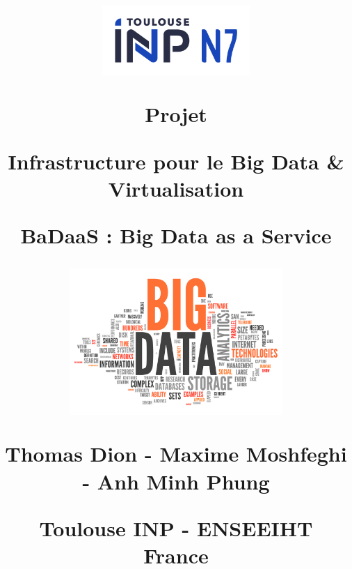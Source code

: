 \documentclass{report}
\title{
    \vspace*{-4cm} %

    \begin{figure}[H]
        \centering
        \includegraphics[width=0.5\textwidth]{Sources/Logos/Logo_ENSEEIHT.png}
        \label{fig:Logo_ENSEEIHT}
    \end{figure}
    
    \vspace*{0.5cm}
    
    Projet
    
    \vspace{1.3cm}
    
    \textbf{Infrastructure pour le Big Data \& Virtualisation}
    
    \vspace{0.7cm}
    
    {\huge BaDaaS : Big Data as a Service}

    \vspace{1.0cm}

    \begin{figure}[H]
        \centering
        \includegraphics[height=210]{Sources/Couverture/BigData1.jpg}
        \label{fig:Couverture}
    \end{figure}

    
    {\large \textbf{Thomas Dion - Maxime Moshfeghi - Anh Minh Phung}}
        
    \vspace{0.5cm}
    
    Toulouse INP - ENSEEIHT\\
    France
}
\begin{document}
\begin{titlepage}

\maketitle

\end{titlepage}


\tableofcontents %


\newpage



\chapter*{}
\end{document}
